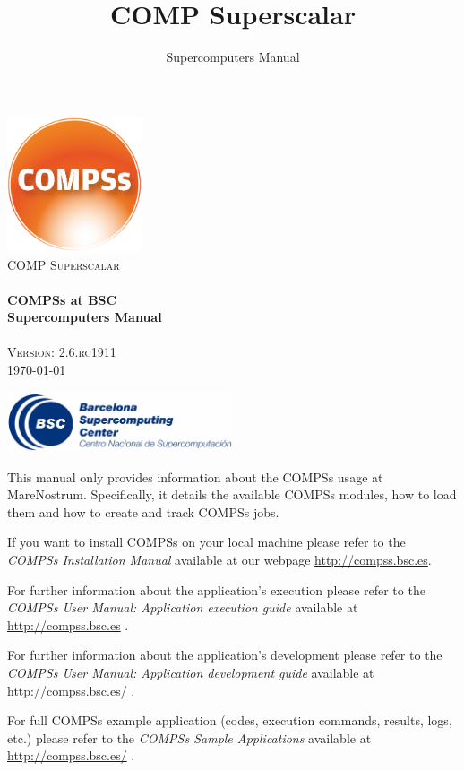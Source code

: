 \documentclass[a4paper,12pt]{article}
\title{COMP Superscalar}
\author{Supercomputers Manual}
\def \compssversion {2.6.rc1911}
\begin{document}
  \hypersetup{pageanchor=false}
  \begin{titlepage} 
    \begin{center} 
      \includegraphics[width=0.3\textwidth]{./Figures/Logos/degradado-naranja-compss.jpg}~\\[1cm] 
      \textsc{\LARGE COMP Superscalar}\\[1.5cm] 
      
      \HRule \\[0.4cm] 
      { \huge \bfseries COMPSs at BSC \\[0.4cm] }
      { \large \bfseries Supercomputers Manual \\[0.4cm] } 
      \HRule \\[1.5cm] 

      { \large \textsc{Version: \compssversion}} \\[0.3cm]
      { \large \today } 
      
      \vfill 
      \includegraphics[width=0.5\textwidth]{./Figures/bsc_280.jpg}~\\[1cm]
    \end{center} 
  \end{titlepage}
  \hypersetup{pageanchor=true}
  
  {
    This manual only provides information about the COMPSs usage at MareNostrum. Specifically, it details the available COMPSs modules,
    how to load them and how to create and track COMPSs jobs. 
    \newline
    
    If you want to install COMPSs on your local machine please refer to the \textit{COMPSs Installation Manual} available at our
    webpage \url{http://compss.bsc.es}.
    
    For further information about the application's execution please refer to the \textit{COMPSs User Manual: Application execution
    guide} available at \url{http://compss.bsc.es} .
    
    For further information about the application's development please refer to the \textit{COMPSs User Manual: Application development
    guide} available at \url{http://compss.bsc.es/} .
    
    For full COMPSs example application (codes, execution commands, results, logs, etc.) please refer to the \textit{COMPSs Sample 
    Applications} available at \url{http://compss.bsc.es/} .
  }
  
\end{document}
